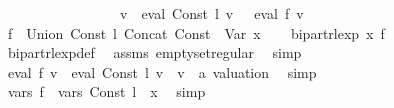 \begin{isabellebody}
\ \ \ \ \ \ \ \ \ \ \ \ \ \ \ \ {\isasymand}\ {\isacharparenleft}{\kern0pt}{\isasymforall}v{\isachardot}{\kern0pt}\ {\isasymPsi}\ {\isacharparenleft}{\kern0pt}eval\ {\isacharparenleft}{\kern0pt}Const\ l{\isacharparenright}{\kern0pt}\ v{\isacharparenright}{\kern0pt}\ {\isacharequal}{\kern0pt}\ {\isasymPsi}\ {\isacharparenleft}{\kern0pt}eval\ f{\isacharprime}{\kern0pt}\ v{\isacharparenright}{\kern0pt}{\isacharparenright}{\kern0pt}{\isachardoublequoteclose}\isanewline
%
\isadelimproof
%
\endisadelimproof
%
\isatagproof
{}\isamarkupfalse%
\ {\isacharminus}{\kern0pt}\isanewline
\ \ \isamarkupfalse%
\ {\isacharquery}{\kern0pt}f{\isacharprime}{\kern0pt}\ {\isacharequal}{\kern0pt}\ {\isachardoublequoteopen}Union\ {\isacharparenleft}{\kern0pt}Const\ l{\isacharparenright}{\kern0pt}\ {\isacharparenleft}{\kern0pt}Concat\ {\isacharparenleft}{\kern0pt}Const\ {\isacharbraceleft}{\kern0pt}{\isacharbraceright}{\kern0pt}{\isacharparenright}{\kern0pt}\ {\isacharparenleft}{\kern0pt}Var\ x{\isacharparenright}{\kern0pt}{\isacharparenright}{\kern0pt}{\isachardoublequoteclose}\isanewline
\ \ \isamarkupfalse%
\ {\isachardoublequoteopen}bipart{\isacharunderscore}{\kern0pt}rlexp\ x\ {\isacharquery}{\kern0pt}f{\isacharprime}{\kern0pt}{\isachardoublequoteclose}\isanewline
\ \ \ \ \isamarkupfalse%
\ bipart{\isacharunderscore}{\kern0pt}rlexp{\isacharunderscore}{\kern0pt}def\ \isamarkupfalse%
\ assms\ emptyset{\isacharunderscore}{\kern0pt}regular\ \isamarkupfalse%
\ simp\isanewline
\ \ \isamarkupfalse%
\ \isamarkupfalse%
\ {\isachardoublequoteopen}eval\ {\isacharquery}{\kern0pt}f{\isacharprime}{\kern0pt}\ v\ {\isacharequal}{\kern0pt}\ eval\ {\isacharparenleft}{\kern0pt}Const\ l{\isacharparenright}{\kern0pt}\ v{\isachardoublequoteclose}\ \ v\ {\isacharcolon}{\kern0pt}{\isacharcolon}{\kern0pt}\ {\isachardoublequoteopen}{\isacharprime}{\kern0pt}a\ valuation{\isachardoublequoteclose}\ \isamarkupfalse%
\ simp\isanewline
\ \ \isamarkupfalse%
\ \isamarkupfalse%
\ {\isachardoublequoteopen}vars\ {\isacharquery}{\kern0pt}f{\isacharprime}{\kern0pt}\ {\isacharequal}{\kern0pt}\ vars\ {\isacharparenleft}{\kern0pt}Const\ l{\isacharparenright}{\kern0pt}\ {\isasymunion}\ {\isacharbraceleft}{\kern0pt}x{\isacharbraceright}{\kern0pt}{\isachardoublequoteclose}\ \isamarkupfalse%
\ simp\ \isanewline
\ \ \isamarkupfalse%
\ \isamarkupfalse%

\end{isabellebody}
